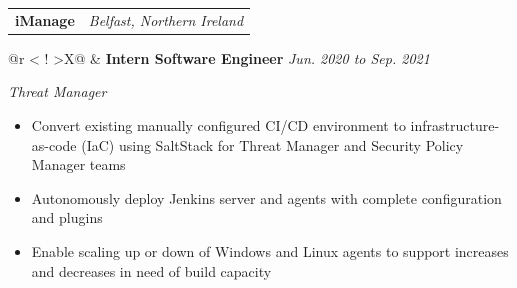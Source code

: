 \begin{tabularx}{\textwidth}{@{}Xr@{}}
    \textbf{iManage} & \textit{Belfast, Northern Ireland}
\end{tabularx}%
\vspace{-1.2em}
\begin{table}[H]
    \renewcommand\arraystretch{1.4}
    \begin{tabularx}{\textwidth}{@{}r <{\hskip -3pt} !{\foo} >{}X@{}}
        \addlinespace[1.5ex]
        & \textbf{Intern Software Engineer} \hfill \textit{Jun. 2020 to Sep. 2021}
        \parbox{\textwidth}{\textit{Threat Manager}}
        \begin{itemize}[topsep=5pt]
            \item Convert existing manually configured CI/CD environment to infrastructure-as-code (IaC) using SaltStack for Threat Manager and Security Policy Manager teams
            \item Autonomously deploy Jenkins server and agents with complete configuration and plugins
            \item Enable scaling up or down of Windows and Linux agents to support increases and decreases in need of build capacity
        \end{itemize} \\
    \end{tabularx}
\end{table}
\vspace{-1.2em}
